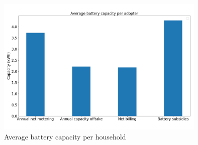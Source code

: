 \begin{figure}[h!]
\centering
\includegraphics[width=10cm]{Policies/AvBat.png}
\caption{Average battery capacity per household}
\label{Figure:batav}
\end{figure}
